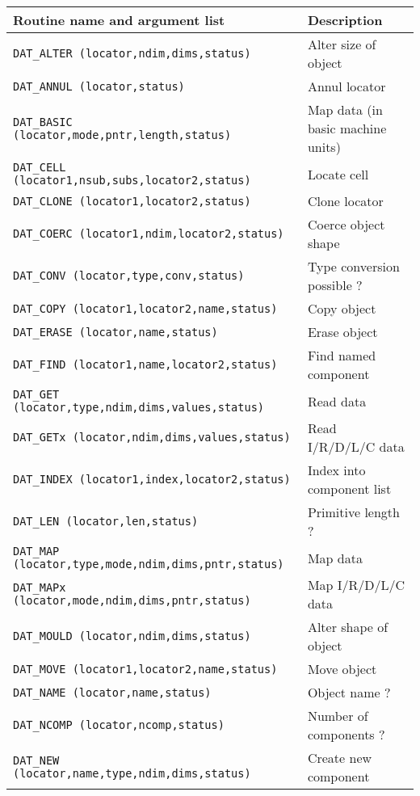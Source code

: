 \begin {table}[htbp]
\begin {center}
\begin {tabular}{||l|l||}
\hline
Routine name and argument list				& Description \\
\hline
{\tt DAT\_ALTER (locator,ndim,dims,status)}		& Alter size of object \\
{\tt DAT\_ANNUL (locator,status)}			& Annul locator \\
{\tt DAT\_BASIC (locator,mode,pntr,length,status)}	& Map data (in basic machine units) \\
{\tt DAT\_CELL (locator1,nsub,subs,locator2,status)}	& Locate cell \\
{\tt DAT\_CLONE (locator1,locator2,status)}		& Clone locator \\
{\tt DAT\_COERC (locator1,ndim,locator2,status)}	& Coerce object shape \\
{\tt DAT\_CONV (locator,type,conv,status)}		& Type conversion possible ? \\
{\tt DAT\_COPY (locator1,locator2,name,status)}		& Copy object \\
{\tt DAT\_ERASE (locator,name,status)}			& Erase object \\
{\tt DAT\_FIND (locator1,name,locator2,status)}		& Find named component \\
{\tt DAT\_GET (locator,type,ndim,dims,values,status)}	& Read data \\
{\tt DAT\_GETx (locator,ndim,dims,values,status)}	& Read I/R/D/L/C data \\
{\tt DAT\_INDEX (locator1,index,locator2,status)}	& Index into component list \\
{\tt DAT\_LEN (locator,len,status)}			& Primitive length ? \\
{\tt DAT\_MAP (locator,type,mode,ndim,dims,pntr,status)}& Map data \\
{\tt DAT\_MAPx (locator,mode,ndim,dims,pntr,status)}	& Map I/R/D/L/C data \\
{\tt DAT\_MOULD (locator,ndim,dims,status)}		& Alter shape of object \\
{\tt DAT\_MOVE (locator1,locator2,name,status)}		& Move object \\
{\tt DAT\_NAME (locator,name,status)}			& Object name ? \\
{\tt DAT\_NCOMP (locator,ncomp,status)}			& Number of components ? \\
{\tt DAT\_NEW (locator,name,type,ndim,dims,status)}	& Create new component \\

\end{tabular}
\end{center}
\end{table}
